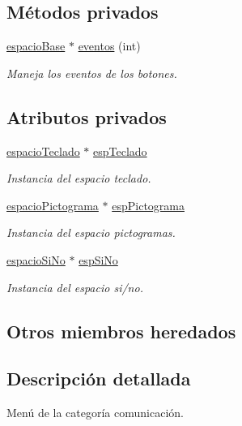\subsection*{Métodos privados}
\begin{DoxyCompactItemize}
\item 
\hyperlink{classespacio_base}{espacio\+Base} $\ast$ \hyperlink{classmenu_comunicacion_a7386759ca2897f5ce031bf4c166fa8a1}{eventos} (int)
\begin{DoxyCompactList}\small\item\em Maneja los eventos de los botones. \end{DoxyCompactList}\end{DoxyCompactItemize}
\subsection*{Atributos privados}
\begin{DoxyCompactItemize}
\item 
\hyperlink{classespacio_teclado}{espacio\+Teclado} $\ast$ \hyperlink{classmenu_comunicacion_a01b499ef3e349868508abfd4f856bbea}{esp\+Teclado}
\begin{DoxyCompactList}\small\item\em Instancia del espacio teclado. \end{DoxyCompactList}\item 
\hyperlink{classespacio_pictograma}{espacio\+Pictograma} $\ast$ \hyperlink{classmenu_comunicacion_ac00c26aae43f331167e102e2b6d7b86c}{esp\+Pictograma}
\begin{DoxyCompactList}\small\item\em Instancia del espacio pictogramas. \end{DoxyCompactList}\item 
\hyperlink{classespacio_si_no}{espacio\+Si\+No} $\ast$ \hyperlink{classmenu_comunicacion_ab9fc64713344f895347473d97f555a8e}{esp\+Si\+No}
\begin{DoxyCompactList}\small\item\em Instancia del espacio si/no. \end{DoxyCompactList}\end{DoxyCompactItemize}
\subsection*{Otros miembros heredados}


\subsection{Descripción detallada}
Menú de la categoría comunicación. 

